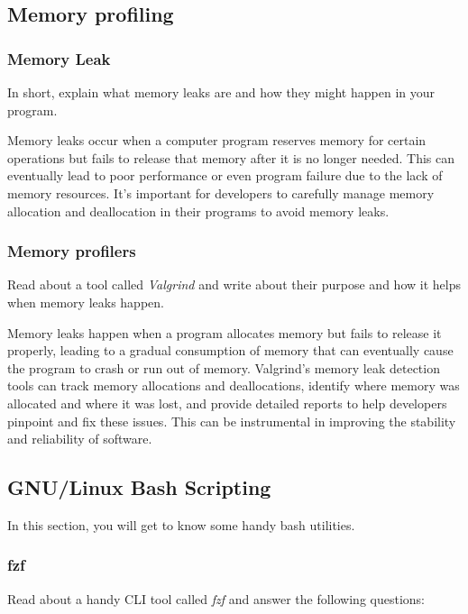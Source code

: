 \documentclass[titlepage]{article}
\begin{document}
	\subsection{Memory profiling}
	\subsubsection{Memory Leak}
	In short, explain what memory leaks are and how they might happen in your program.
	
	Memory leaks occur when a computer program reserves memory for certain operations but fails to release that memory after it is no longer needed. This can eventually lead to poor performance or even program failure due to the lack of memory resources. It's important for developers to carefully manage memory allocation and deallocation in their programs to avoid memory leaks.
	
	\subsubsection{Memory profilers}
	Read about a tool called \textit{Valgrind} and write about their purpose and how it helps when memory leaks happen.
	
	Memory leaks happen when a program allocates memory but fails to release it properly, leading to a gradual consumption of memory that can eventually cause the program to crash or run out of memory. Valgrind's memory leak detection tools can track memory allocations and deallocations, identify where memory was allocated and where it was lost, and provide detailed reports to help developers pinpoint and fix these issues. This can be instrumental in improving the stability and reliability of software. 
	
	\subsection{GNU/Linux Bash Scripting}
	In this section, you will get to know some handy bash utilities.
	
	\subsubsection{fzf}
	Read about a handy CLI tool called \textit{fzf} and answer the following questions:
	
\end{document}
